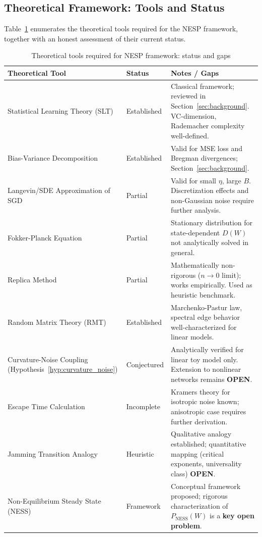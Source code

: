 \documentclass[
  journal=largetwo,
  year=2025,
  volume=37,
]{cup-journal}
\begin{document}
\subsection{Theoretical Framework: Tools and Status}

Table~\ref{tab:theoretical_requirements} enumerates the theoretical tools required for the NESP framework, together with an honest assessment of their current status.

\begin{table}[htb]
\centering
\footnotesize
\caption{Theoretical tools required for NESP framework: status and gaps}
\label{tab:theoretical_requirements}
\begin{tabular}{@{}p{3.5cm}p{2cm}p{6cm}@{}}
\toprule
\textbf{Theoretical Tool} & \textbf{Status} & \textbf{Notes / Gaps} \\
\midrule
Statistical Learning Theory (SLT) & \textcolor{green!60!black}{Established} & Classical framework; reviewed in Section~\ref{sec:background}. VC-dimension, Rademacher complexity well-defined. \\
\addlinespace[2pt]
Bias-Variance Decomposition & \textcolor{green!60!black}{Established} & Valid for MSE loss and Bregman divergences; Section~\ref{sec:background}. \\
\addlinespace[2pt]
Langevin/SDE Approximation of SGD & \textcolor{orange!80!black}{Partial} & Valid for small $\eta$, large $B$. Discretization effects and non-Gaussian noise require further analysis. \\
\addlinespace[2pt]
Fokker-Planck Equation & \textcolor{orange!80!black}{Partial} & Stationary distribution for state-dependent $D(W)$ not analytically solved in general. \\
\addlinespace[2pt]
Replica Method & \textcolor{orange!80!black}{Partial} & Mathematically non-rigorous ($n\to 0$ limit); works empirically. Used as heuristic benchmark. \\
\addlinespace[2pt]
Random Matrix Theory (RMT) & \textcolor{green!60!black}{Established} & Marchenko-Pastur law, spectral edge behavior well-characterized for linear models. \\
\addlinespace[2pt]
Curvature-Noise Coupling (Hypothesis~\ref{hyp:curvature_noise}) & \textcolor{red!70!black}{Conjectured} & Analytically verified for linear toy model only. Extension to nonlinear networks remains \textbf{OPEN}. \\
\addlinespace[2pt]
Escape Time Calculation & \textcolor{red!70!black}{Incomplete} & Kramers theory for isotropic noise known; anisotropic case requires further derivation. \\
\addlinespace[2pt]
Jamming Transition Analogy & \textcolor{orange!80!black}{Heuristic} & Qualitative analogy established; quantitative mapping (critical exponents, universality class) \textbf{OPEN}. \\
\addlinespace[2pt]
Non-Equilibrium Steady State (NESS) & \textcolor{red!70!black}{Framework} & Conceptual framework proposed; rigorous characterization of $P_{\text{NESS}}(W)$ is a \textbf{key open problem}. \\
\bottomrule
\end{tabular}
\end{table}
\end{document}

